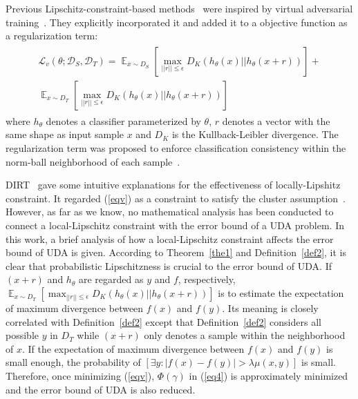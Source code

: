 \documentclass[journal,twocolumn]{IEEEtran}
\theoremstyle{definition}
\begin{document}
Previous Lipschitz-constraint-based methods~\cite{shu2018a,mao2019virtual} were inspired by  virtual adversarial training~\cite{miyato2018virtual}. They explicitly incorporated it and added it to a objective function as a regularization term:
\begin{align}
\begin{gathered}
\mathcal L_v(\theta;{\mathcal D_S}, {\mathcal D_T})=\mathop{\mathbb{E}}_{x\sim D_S}[\max_{||r||\leq\epsilon} D_{K}(h_{\theta}(x)||h_{\theta}(x+r))]+\\
\mathop{\mathbb {E}}_{x\sim D_T}[\max_{||r||\leq\epsilon} D_{K}(h_{\theta}(x)||h_{\theta}(x+r))]
\label{eqv}
\end{gathered}
\end{align}
where $h_{\theta}$ denotes a classifier parameterized by $\theta$, $r$ denotes a vector  with the same shape as input sample $x$ and $D_{K}$ is the Kullback-Leibler divergence. The regularization term was proposed to enforce classification consistency within the norm-ball neighborhood of each sample~\cite{miyato2018virtual}. 

DIRT~\cite{shu2018a} gave some intuitive explanations for the effectiveness of locally-Lipshitz constraint. It regarded (\ref{eqv}) as a constraint to satisfy the cluster assumption~\cite{grandvalet2004semi-supervised}. However, as far as we know, no mathematical analysis has been conducted to connect a local-Lipschitz constraint with the error bound of a UDA problem. In this work, a brief analysis of how a local-Lipschitz constraint affects the error bound of UDA is given. According to Theorem~\ref{the1} and Definition~\ref{def2}, it is clear that probabilistic Lipschitzness is crucial to the error bound of UDA. If $(x+r)$ and $h_{\theta}$ are regarded as $y$ and $f$, respectively, $\mathop{\mathbb {E}}_{x\sim D_T}[\max_{||r||\leq\epsilon} D_{K}(h_{\theta}(x)||h_{\theta}(x+r))]$ is to estimate the expectation of maximum divergence between $f(x)$ and $f(y)$. Its meaning is closely correlated with Definition~\ref{def2} except that Definition~\ref{def2} considers all possible $y$ in $D_T$ while $(x+r)$ only denotes a sample within the neighborhood of $x$. If the expectation of maximum divergence between $f(x)$ and $f(y)$ is small enough, the probability of $[\exists y: |f(x)-f(y)|>\lambda\mu(x,y)]$ is small.  Therefore, once minimizing (\ref{eqv}), $\Phi(\gamma)$ in (\ref{eq4}) is approximately minimized and the error bound of UDA is also reduced.
\end{document}
